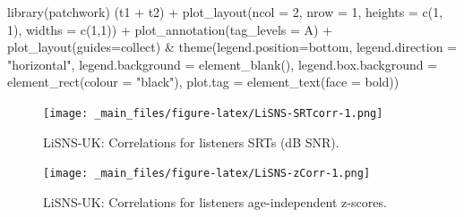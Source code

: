 \documentclass[a4paper, twoside]{templates/ociamthesis}
\newenvironment{Shaded}{\begin{snugshade}}{\end{snugshade}}
\newcommand{\AttributeTok}[1]{\textcolor[rgb]{0.77,0.63,0.00}{#1}}
\newcommand{\DecValTok}[1]{\textcolor[rgb]{0.00,0.00,0.81}{#1}}
\newcommand{\FunctionTok}[1]{\textcolor[rgb]{0.00,0.00,0.00}{#1}}
\newcommand{\NormalTok}[1]{#1}
\newcommand{\SpecialCharTok}[1]{\textcolor[rgb]{0.00,0.00,0.00}{#1}}
\newcommand{\StringTok}[1]{\textcolor[rgb]{0.31,0.60,0.02}{#1}}
\renewenvironment{Shaded}
{
  \vspace{4pt}%
  \begin{snugshade}%
}{%
  \end{snugshade}%
  \vspace{4pt}%
}
\newcommand*{\bibtitle}{Works Cited}
\begin{document}
\begin{Shaded}
\begin{Highlighting}[]
\FunctionTok{library}\NormalTok{(patchwork)}
\NormalTok{(t1 }\SpecialCharTok{+}\NormalTok{ t2) }\SpecialCharTok{+} \FunctionTok{plot\_layout}\NormalTok{(}\AttributeTok{ncol =} \DecValTok{2}\NormalTok{, }\AttributeTok{nrow =} \DecValTok{1}\NormalTok{, }\AttributeTok{heights =} \FunctionTok{c}\NormalTok{(}\DecValTok{1}\NormalTok{, }\DecValTok{1}\NormalTok{), }\AttributeTok{widths =} \FunctionTok{c}\NormalTok{(}\DecValTok{1}\NormalTok{,}\DecValTok{1}\NormalTok{)) }\SpecialCharTok{+} \FunctionTok{plot\_annotation}\NormalTok{(}\AttributeTok{tag\_levels =} \StringTok{\textquotesingle{}A\textquotesingle{}}\NormalTok{) }\SpecialCharTok{+} \FunctionTok{plot\_layout}\NormalTok{(}\AttributeTok{guides=}\StringTok{\textquotesingle{}collect\textquotesingle{}}\NormalTok{) }\SpecialCharTok{\&}
  \FunctionTok{theme}\NormalTok{(}\AttributeTok{legend.position=}\StringTok{\textquotesingle{}bottom\textquotesingle{}}\NormalTok{,        }
        \AttributeTok{legend.direction =} \StringTok{"horizontal"}\NormalTok{,}
        \AttributeTok{legend.background =} \FunctionTok{element\_blank}\NormalTok{(),}
        \AttributeTok{legend.box.background =} \FunctionTok{element\_rect}\NormalTok{(}\AttributeTok{colour =} \StringTok{"black"}\NormalTok{),}
        \AttributeTok{plot.tag =} \FunctionTok{element\_text}\NormalTok{(}\AttributeTok{face =} \StringTok{\textquotesingle{}bold\textquotesingle{}}\NormalTok{))}
\end{Highlighting}
\end{Shaded}

\begin{figure}
\centering
\texttt{[image: \_main\_files/figure-latex/LiSNS-SRTcorr-1.png]}
\caption{\label{fig:LiSNS-SRTcorr} LiSNS-UK: Correlations for listeners SRTs (dB SNR).}
\end{figure}

\begin{figure}
\centering
\texttt{[image: \_main\_files/figure-latex/LiSNS-zCorr-1.png]}
\caption{\label{fig:LiSNS-zcorr} LiSNS-UK: Correlations for listeners age-independent z-scores.}
\end{figure}




\setlength{\baselineskip}{0pt} %

{\renewcommand*\MakeUppercase[1]{#1}%
\printbibliography[heading=bibintoc,title={\bibtitle}]}
\end{document}
